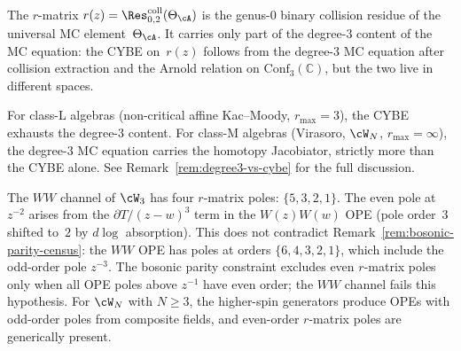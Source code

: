 \begin{remark}
\label{rem:rmatrix-vs-mc3-census}
The $r$-matrix $r(z) = \Res^{\mathrm{coll}}_{0,2}(\Theta_\cA)$
is the genus-$0$ binary collision residue of the universal MC
element~$\Theta_\cA$. It carries only part of the degree-$3$
content of the MC equation: the CYBE on~$r(z)$ follows
from the degree-$3$ MC equation after collision extraction and the
Arnold relation on $\mathrm{Conf}_3(\mathbb{C})$, but the two live
in different spaces.

For class-L algebras (non-critical affine Kac--Moody,
$r_{\max} = 3$), the
CYBE exhausts the degree-$3$ content. For class-M algebras
(Virasoro, $\cW_N$, $r_{\max} = \infty$), the degree-$3$ MC
equation carries the homotopy Jacobiator, strictly more than
the CYBE alone.
See Remark~\ref{rem:degree3-vs-cybe} for the full discussion.
\end{remark}

\begin{remark}
\label{rem:ww-even-poles-census}
The $WW$ channel of $\cW_3$ has four $r$-matrix poles:
$\{5, 3, 2, 1\}$. The even pole at $z^{-2}$ arises from the
$\partial T/(z{-}w)^3$ term in the $W(z)W(w)$ OPE (pole order~$3$
shifted to~$2$ by $d\log$ absorption). This does not contradict
Remark~\ref{rem:bosonic-parity-census}: the $WW$ OPE has poles at
orders $\{6, 4, 3, 2, 1\}$, which include the odd-order pole
$z^{-3}$. The bosonic parity constraint excludes even $r$-matrix
poles only when all OPE poles above $z^{-1}$ have even order;
the $WW$ channel fails this hypothesis. For $\cW_N$ with
$N \geq 3$, the higher-spin generators produce OPEs with
odd-order poles from composite fields, and even-order $r$-matrix
poles are generically present.
\end{remark}

